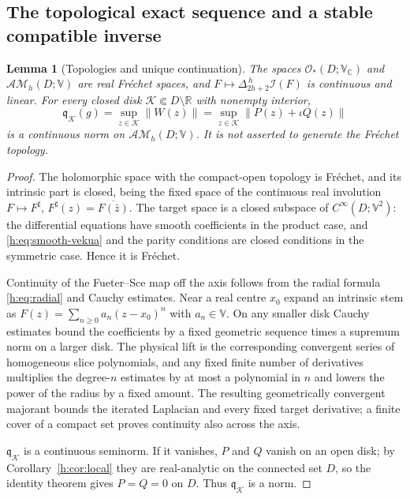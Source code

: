 \documentclass[11pt,a4paper]{article}
\numberwithin{equation}{section}
\newtheorem{lemma}[theorem]{Lemma}
\theoremstyle{definition}
\theoremstyle{remark}
\theoremstyle{plain}
\newcommand{\RR}{\mathbb R}
\newcommand{\CC}{\mathbb C}
\newcommand{\I}{\mathcal I}
\newcommand{\AM}{\mathcal{AM}}
\newcommand{\norm}[1]{\lVert #1\rVert}
\newcommand{\lapH}{\Delta_{2h+2}^{\,h}}
\newcommand{\VV}{\mathbb V}                       %
\newcommand{\VC}{\mathbb V_{\CC}}                 %
\begin{document}
\subsection{The topological exact sequence and a stable compatible inverse}
\label{h:sec:topology}

\begin{lemma}[Topologies and unique continuation]\label{h:lem:Frechet}
The spaces $\mathcal O_*(D;\VC)$ and $\AM_h(D;\VV)$ are real Fr\'echet spaces,
and $F\mapsto\lapH\I(F)$ is continuous and linear. For every closed disk
$\mathcal K\Subset D\setminus\RR$ with nonempty interior,
\begin{equation}\label{h:eq:continuous-norm}
 \mathfrak q_{\mathcal K}(g)=\sup_{z\in\mathcal K}\norm{W(z)}
 =\sup_{z\in\mathcal K}\norm{P(z)+\iota Q(z)}
\end{equation}
is a continuous norm on $\AM_h(D;\VV)$. It is not asserted to generate the
Fr\'echet topology.
\end{lemma}

\begin{proof}
The holomorphic space with the compact-open topology is Fr\'echet, and its
intrinsic part is closed, being the fixed space of the continuous real
involution $F\mapsto F^\sharp$, $F^\sharp(z)=\overline{F(\bar z)}$. The target
space is a closed subspace of $C^\infty(D;\VV^2)$: the differential equations
have smooth coefficients in the product case, and \eqref{h:eq:smooth-vekua} and
the parity conditions are closed conditions in the symmetric case. Hence it is
Fr\'echet.

Continuity of the Fueter--Sce map off the axis follows from the radial formula
\eqref{h:eq:radial} and Cauchy estimates. Near a real centre $x_0$ expand an
intrinsic stem as $F(z)=\sum_{n\ge0}a_n(z-x_0)^n$ with $a_n\in\VV$. On any
smaller disk Cauchy estimates bound the coefficients by a fixed geometric
sequence times a supremum norm on a larger disk. The physical lift is the
corresponding convergent series of homogeneous slice polynomials, and any fixed
finite number of derivatives multiplies the degree-$n$ estimates by at most a
polynomial in $n$ and lowers the power of the radius by a fixed amount. The
resulting geometrically convergent majorant bounds the iterated Laplacian and
every fixed target derivative; a finite cover of a compact set proves
continuity also across the axis.

$\mathfrak q_{\mathcal K}$ is a continuous seminorm. If it vanishes, $P$ and $Q$
vanish on an open disk; by Corollary~\ref{h:cor:local} they are real-analytic
on the connected set $D$, so the identity theorem gives $P=Q=0$ on $D$. Thus
$\mathfrak q_{\mathcal K}$ is a norm.
\end{proof}
\end{document}
